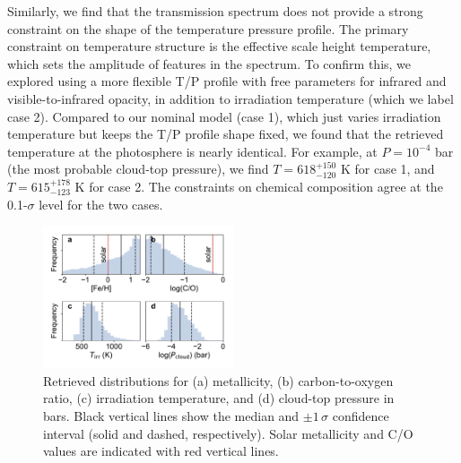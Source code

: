 \documentclass[twocolumn, trackchanges]{aastex61}
\begin{document}
Similarly, we find that the transmission spectrum does not provide a strong constraint on the shape of the temperature pressure profile. The primary constraint on temperature structure is the effective scale height temperature, which sets the amplitude of features in the spectrum. To confirm this, we explored using a more flexible T/P profile with free parameters for infrared and visible-to-infrared opacity, in addition to irradiation temperature (which we label case 2). Compared to our nominal model (case 1), which just varies irradiation temperature but keeps the T/P profile shape fixed, we found that the retrieved temperature at the photosphere is nearly identical. For example, at $P = 10^{-4}$ bar (the most probable cloud-top pressure), we find $T = 618^{+150}_{-120}$ K for case 1, and $T = 615^{+178}_{-123}$ K for case 2. The constraints on chemical composition agree at the 0.1-$\sigma$ level for the two cases.


\begin{figure}
\includegraphics[width = 0.5\textwidth]{fig4_retrieval.pdf}
\caption{Retrieved distributions for (a) metallicity, (b) carbon-to-oxygen ratio, (c) irradiation temperature, and (d) cloud-top pressure in bars. Black vertical lines show the median and $\pm1\,\sigma$ confidence interval (solid and dashed, respectively). Solar metallicity and C/O values are indicated with red vertical lines.}  \label{fig:retrieval}
\end{figure}
\end{document}
